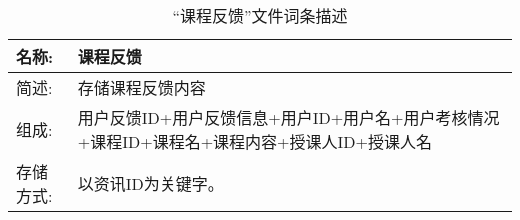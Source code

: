 \begin{table}[H]  
\caption{“课程反馈”文件词条描述}  
\begin{center}  
    \begin{tabular}{l p{10cm}} 
        \hline
        \quad 名称: & 课程反馈 \\
        \hline
        \quad 简述: & 存储课程反馈内容\\
        \hline
        \quad 组成: & 用户反馈ID+用户反馈信息+用户ID+用户名+用户考核情况+课程ID+课程名+课程内容+授课人ID+授课人名 \\
        \hline
        \quad 存储方式: & 以资讯ID为关键字。 \\
        \hline
    \end{tabular}
    \label{tab1}
\end{center}
\end{table}
